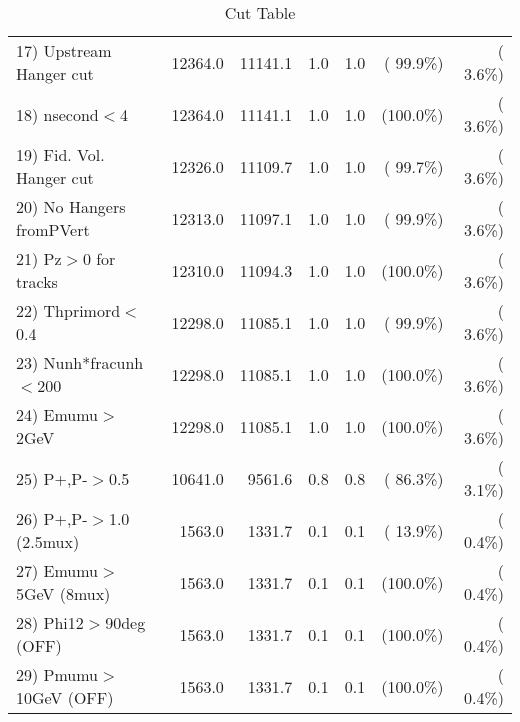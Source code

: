 \begin{table}[h!]
\begin{tabular}{||l||r|r|r|r|r|r||}
 17) Upstream Hanger cut  &      12364.0 &      11141.1 &          1.0 &          1.0 & ( 99.9\%) & (  3.6\%) \\
 18) nsecond$<$4          &      12364.0 &      11141.1 &          1.0 &          1.0 & (100.0\%) & (  3.6\%) \\
 19) Fid. Vol. Hanger cut &      12326.0 &      11109.7 &          1.0 &          1.0 & ( 99.7\%) & (  3.6\%) \\
 20) No Hangers fromPVert &      12313.0 &      11097.1 &          1.0 &          1.0 & ( 99.9\%) & (  3.6\%) \\
 21) Pz$>$0 for tracks    &      12310.0 &      11094.3 &          1.0 &          1.0 & (100.0\%) & (  3.6\%) \\
 22) Thprimord$<$0.4      &      12298.0 &      11085.1 &          1.0 &          1.0 & ( 99.9\%) & (  3.6\%) \\
 23) Nunh*fracunh$<$200   &      12298.0 &      11085.1 &          1.0 &          1.0 & (100.0\%) & (  3.6\%) \\
 24) Emumu$>$2GeV         &      12298.0 &      11085.1 &          1.0 &          1.0 & (100.0\%) & (  3.6\%) \\
 25) P+,P-$>$0.5          &      10641.0 &       9561.6 &          0.8 &          0.8 & ( 86.3\%) & (  3.1\%) \\
 26) P+,P-$>$1.0 (2.5mux) &       1563.0 &       1331.7 &          0.1 &          0.1 & ( 13.9\%) & (  0.4\%) \\
 27) Emumu$>$5GeV  (8mux) &       1563.0 &       1331.7 &          0.1 &          0.1 & (100.0\%) & (  0.4\%) \\
 28) Phi12$>$90deg  (OFF) &       1563.0 &       1331.7 &          0.1 &          0.1 & (100.0\%) & (  0.4\%) \\
 29) Pmumu$>$10GeV  (OFF) &       1563.0 &       1331.7 &          0.1 &          0.1 & (100.0\%) & (  0.4\%) \\
 \hline
 \hline
 \end{tabular}
 \caption{Cut Table           }
 \label{tab-cutcohjpsi-mumu_jpsi}
 \end{table}
